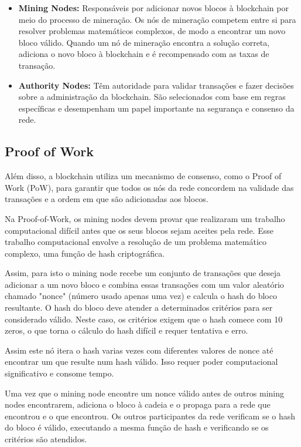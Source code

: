 \documentclass[conference]{IEEEtran}
\begin{document}
\begin{itemize}
\begin{itemize}
\begin{itemize}
                \item \textbf{Mining Nodes:} Responsáveis por adicionar novos blocos à blockchain por meio do processo de mineração. Os nós de mineração competem entre si para resolver problemas matemáticos complexos, de modo a encontrar um novo bloco válido. Quando um nó de mineração encontra a solução correta, adiciona o novo bloco à blockchain e é recompensado com as taxas de transação.
                \item \textbf{Authority Nodes:} Têm autoridade para validar transações e fazer decisões sobre a administração da blockchain. São selecionados com base em regras específicas e desempenham um papel importante na segurança e consenso da rede.
            \end{itemize}
        \end{itemize}
    \end{itemize}

    \subsection{Proof of Work}
    Além disso, a blockchain utiliza um mecanismo de consenso, como o Proof of Work (PoW), para garantir que todos os nós da rede concordem na validade das transações e a ordem em que são adicionadas aos blocos.

    Na Proof-of-Work, os mining nodes devem provar que realizaram um trabalho computacional difícil antes que os seus blocos sejam aceites pela rede. Esse trabalho computacional envolve a resolução de um problema matemático complexo, uma função de hash criptográfica.

    Assim, para isto o mining node recebe um conjunto de transações que deseja adicionar a um novo bloco e combina essas transações com um valor aleatório chamado "nonce" (número usado apenas uma vez) e calcula o hash do bloco resultante.
    O hash do bloco deve atender a determinados critérios para ser considerado válido. Neste caso, os critérios exigem que o hash comece com 10 zeros, o que torna o cálculo do hash difícil e requer tentativa e erro.

    Assim este nó itera o hash varias vezes com diferentes valores de nonce até encontrar um que resulte num hash válido. Isso requer poder computacional significativo e consome tempo.

    Uma vez que o mining node encontre um nonce válido antes de outros mining nodes encontrarem, adiciona o bloco à cadeia e o propaga para a rede que encontrou e o que encontrou. Os outros participantes da rede verificam se o hash do bloco é válido, executando a mesma função de hash e verificando se os critérios são atendidos.
\end{document}

